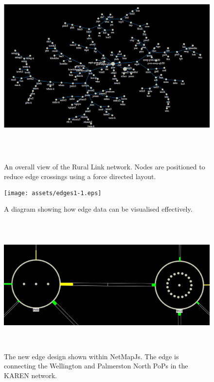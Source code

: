 \documentclass[11pt, a4paper]{article}
\begin{document}
\begin{figure}
\centering
\includegraphics[width=170mm,height=102.54mm]{assets/edges1-0.eps}
\caption{An overall view of the Rural Link network. Nodes are positioned to
reduce edge crossings using a force directed layout.}
\label{fig:edges1.0}
\end{figure}

\begin{figure}
\centering
\texttt{[image: assets/edges1-1.eps]}
\caption{A diagram showing how edge data can be visualised effectively.}
\label{fig:edges1.1}
\end{figure}

\begin{figure}
\centering
\includegraphics[width=170mm,height=70.21mm]{assets/edges1-2.eps}
\caption{The new edge design shown within NetMapJs. The edge is connecting the
Wellington and Palmerston North PoPs in the KAREN network.}
\label{fig:edges1.2}
\end{figure}
\end{document}
